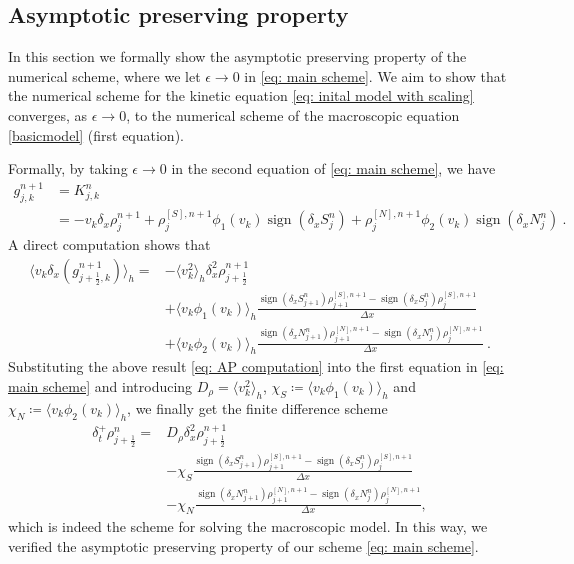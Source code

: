 \documentclass[11pt,twoside]{article}
\theoremstyle{nonumberplain}
\DeclareMathOperator{\sign}{sign}
\begin{document}
\subsection{Asymptotic preserving property}
In this section we formally show the asymptotic preserving property of the numerical scheme, where we let $\epsilon\to 0$ in \eqref{eq: main scheme}. We aim to show that the numerical scheme for the kinetic equation \eqref{eq: inital model with scaling} converges, as $\epsilon\to 0$, to the numerical scheme of the macroscopic equation \eqref{basicmodel} (first equation).

{Formally, by taking $\epsilon\to0$ in the second equation of \eqref{eq: main scheme}, we have 
\begin{align*}
    g_{j,k}^{n+1} & = K_{j,k}^n \\
    & = -v_k\delta_x\rho_{j}^{n+1}+
    \rho^{[S],n+1}_{j}\phi_1(v_k) \sign(\delta_x S_j^n) +\rho^{[N],n+1}_{j} \phi_2(v_k) \sign(\delta_x N_j^n)\ .
\end{align*}
A direct computation shows that
\begin{align}
    \langle v_k \delta_x(g_{j+\frac12,k}^{n+1}) \rangle_h = &
    -\langle v_k^2  \rangle_h \delta^2_x \rho_{j+\frac12}^{n+1}\nonumber \\
    &+ \langle v_k \phi_1(v_k) \rangle_h \frac{\sign(\delta_x S_{j+1}^n) \rho^{[S],n+1}_{j+1} - \sign(\delta_x S_{j}^n) \rho^{[S],n+1}_{j}}{\Delta x}\nonumber\\
    &+\langle v_k \phi_2(v_k) \rangle_h \frac{\sign(\delta_x N_{j+1}^n) \rho^{[N],n+1}_{j+1} - \sign(\delta_x N_{j}^n) \rho^{[N],n+1}_{j}}{\Delta x}\ .\label{eq: AP computation}
\end{align}
}
{
Substituting the above result \eqref{eq: AP computation} into the first equation in  \eqref{eq: main scheme} and introducing $D_\rho=\langle v_k^2\rangle_h$, 
$\chi_S \coloneqq \langle v_k \phi_1(v_k) \rangle_h$ and 
$\chi_N \coloneqq \langle v_k \phi_2(v_k) \rangle_h$, 
we finally get the finite difference scheme 
\begin{align*}
    \delta_t^+\rho_{j+\frac{1}{2}}^n = &D_\rho \delta_x^2 \rho_{j+\frac12}^{n+1} \\
    &- \chi_S \frac{\sign(\delta_x S_{j+1}^n) \rho^{[S],n+1}_{j+1} - \sign(\delta_x S_{j}^n) \rho^{[S],n+1}_{j}}{\Delta x} \\
    &- \chi_N \frac{\sign(\delta_x N_{j+1}^n) \rho^{[N],n+1}_{j+1} - \sign(\delta_x N_{j}^n) \rho^{[N],n+1}_{j}}{\Delta x},
\end{align*}
which is indeed the scheme for solving the macroscopic model. 
In this way, we verified the asymptotic preserving property of our scheme \eqref{eq: main scheme}.
}
\end{document}
